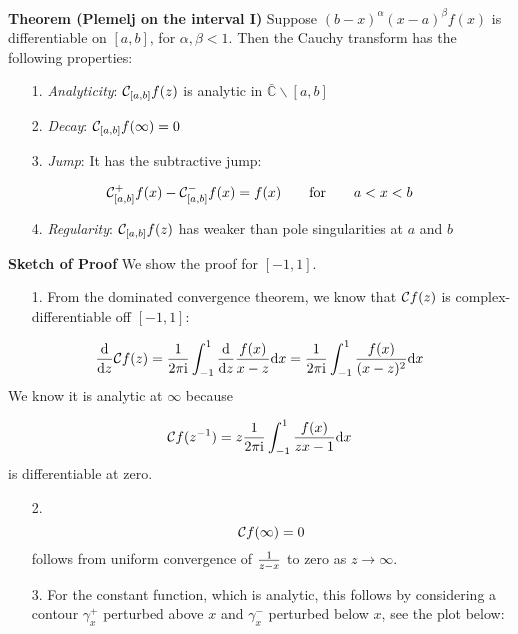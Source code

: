 \documentclass[12pt,a4paper]{article}
\def\qqfor{\qquad\hbox{for}\qquad}
\def\D{ {\rm d} }
\def\I{ {\rm i} }
\def\C{ {\mathbb C} }
\def\CC{ {\cal C} }
\def\dx{\D x}
\begin{document}
\textbf{Theorem (Plemelj on the interval I)} Suppose $(b-x)^\alpha (x-a)^\beta f(x)$ is differentiable  on $[a,b]$, for $\alpha, \beta < 1$. Then the Cauchy transform has the following properties:

\begin{itemize}
\item[1. ] \emph{Analyticity}: $\CC_{[a,b]} f(z)$ is analytic in $\bar \C \backslash [a,b]$


\item[2. ] \emph{Decay}: $\CC_{[a,b]} f(\infty) = 0$


\item[3. ] \emph{Jump}: It has the subtractive jump:

\end{itemize}
\[
\CC_{[a,b]}^+ f(x) - \CC_{[a,b]}^- f(x) = f(x) \qqfor a < x < b
\]
\begin{itemize}
\item[4. ] \emph{Regularity}: $\CC_{[a,b]} f(z)$ has weaker than pole singularities at $a$ and $b$

\end{itemize}
\textbf{Sketch of Proof} We show the proof for $[-1,1]$.

\begin{itemize}
\item[1. ] From the dominated convergence theorem, we know that $\CC f(z)$ is complex-differentiable off $[-1,1]$:

\end{itemize}
\[
{\D \over \D z} {\cal C} f(z) = {1 \over 2 \pi \I}\int_{-1}^1  {\D \over \D z} {f(x) \over x - z} \dx = {1 \over 2 \pi \I}\int_{-1}^1   {f(x) \over (x - z)^2} \dx
\]
We know it is analytic at $\infty$ because

\[
{\cal C} f(z^{-1}) = z {1 \over 2 \pi \I}\int_{-1}^1   {f(x) \over z x - 1} \dx
\]
is differentiable at zero.

\begin{itemize}
\item[2. ] \[
{\cal C} f(\infty) = 0
\]
follows from uniform convergence of $1 \over z - x$ to zero as $z \rightarrow \infty$.


\item[3. ] For the constant function, which is analytic, this follows by considering a contour $\gamma_x^+$ perturbed above $x$ and $\gamma_x^-$ perturbed below $x$, see the plot below:

\end{itemize}
\end{document}
